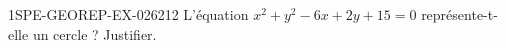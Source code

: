 \begin{exercice}{1SPE-GEOREP-EX-026}{2}{12}
L'équation $x^2 + y^2 - 6x + 2y + 15 = 0$ représente-t-elle un cercle ? Justifier.
\end{exercice}
